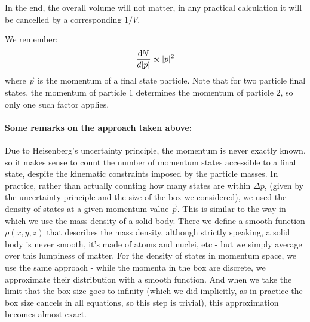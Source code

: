 In the end, the overall volume will not matter, in any practical calculation it will be cancelled by a corresponding $1/V$. 

We remember:
\begin{equation}
\frac{\mathrm{d}\:\!\!N}{d|\vec{p}|} \propto |p|^2
\end{equation}
where $\vec{p}$ is the momentum of a final state particle.
Note that for two particle final states, the momentum of particle $1$ determines the momentum of particle $2$, so only one such factor applies.

\paragraph{Some remarks on the approach taken above:}
Due to Heisenberg's uncertainty principle, the  momentum is never exactly known, so it makes sense to count the number of momentum states accessible to a final state, despite the kinematic constraints imposed by the particle masses. In practice, rather than actually counting how many states are within $\Delta p$,
(given by the uncertainty principle and the size of the box we considered), 
we used the density of states at a given momentum value $\vec{p}$. This is similar to the way in which we use the mass density of a solid body. There we define a smooth function $\rho(x,y,z)$ that describes the mass density, although strictly speaking, a solid body is never smooth, it's made of atoms and nuclei, etc - but we simply average over this lumpiness of matter. For the density of states in momentum space, we use the same approach - while the momenta in the box are discrete, we approximate their distribution with a smooth function. And when we take the limit that the box size goes to infinity (which we did implicitly, as in practice the box size cancels in all equations, so this step is trivial), this approximation becomes almost exact.
